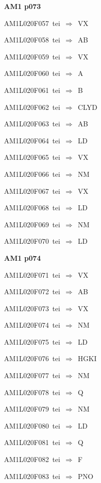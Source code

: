 \par\vfill\eject
{\bf\hfill AM1 p073\hfill\hbox{}}\par\bigskip
{\sixrm AM1L020F057\ {\sixit tei}\ }$\Rightarrow$\ VX\par\smallskip
{\sixrm AM1L020F058\ {\sixit tei}\ }$\Rightarrow$\ AB\par\smallskip
{\sixrm AM1L020F059\ {\sixit tei}\ }$\Rightarrow$\ VX\par\smallskip
{\sixrm AM1L020F060\ {\sixit tei}\ }$\Rightarrow$\ A\par\smallskip
{\sixrm AM1L020F061\ {\sixit tei}\ }$\Rightarrow$\ B\par\smallskip
{\sixrm AM1L020F062\ {\sixit tei}\ }$\Rightarrow$\ CLYD\par\smallskip
{\sixrm AM1L020F063\ {\sixit tei}\ }$\Rightarrow$\ AB\par\smallskip
{\sixrm AM1L020F064\ {\sixit tei}\ }$\Rightarrow$\ LD\par\smallskip
{\sixrm AM1L020F065\ {\sixit tei}\ }$\Rightarrow$\ VX\par\smallskip
{\sixrm AM1L020F066\ {\sixit tei}\ }$\Rightarrow$\ NM\par\smallskip
{\sixrm AM1L020F067\ {\sixit tei}\ }$\Rightarrow$\ VX\par\smallskip
{\sixrm AM1L020F068\ {\sixit tei}\ }$\Rightarrow$\ LD\par\smallskip
{\sixrm AM1L020F069\ {\sixit tei}\ }$\Rightarrow$\ NM\par\smallskip
{\sixrm AM1L020F070\ {\sixit tei}\ }$\Rightarrow$\ LD\par\smallskip

\par\vfill\eject
{\bf\hfill AM1 p074\hfill\hbox{}}\par\bigskip
{\sixrm AM1L020F071\ {\sixit tei}\ }$\Rightarrow$\ VX\par\smallskip
{\sixrm AM1L020F072\ {\sixit tei}\ }$\Rightarrow$\ AB\par\smallskip
{\sixrm AM1L020F073\ {\sixit tei}\ }$\Rightarrow$\ VX\par\smallskip
{\sixrm AM1L020F074\ {\sixit tei}\ }$\Rightarrow$\ NM\par\smallskip
{\sixrm AM1L020F075\ {\sixit tei}\ }$\Rightarrow$\ LD\par\smallskip
{\sixrm AM1L020F076\ {\sixit tei}\ }$\Rightarrow$\ HGKI\par\smallskip
{\sixrm AM1L020F077\ {\sixit tei}\ }$\Rightarrow$\ NM\par\smallskip
{\sixrm AM1L020F078\ {\sixit tei}\ }$\Rightarrow$\ Q\par\smallskip
{\sixrm AM1L020F079\ {\sixit tei}\ }$\Rightarrow$\ NM\par\smallskip
{\sixrm AM1L020F080\ {\sixit tei}\ }$\Rightarrow$\ LD\par\smallskip
{\sixrm AM1L020F081\ {\sixit tei}\ }$\Rightarrow$\ Q\par\smallskip
{\sixrm AM1L020F082\ {\sixit tei}\ }$\Rightarrow$\ F\par\smallskip
{\sixrm AM1L020F083\ {\sixit tei}\ }$\Rightarrow$\ PNO\par\smallskip

